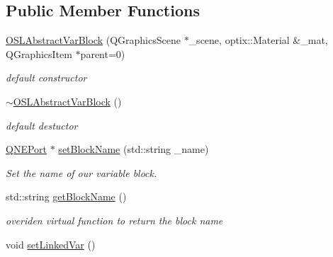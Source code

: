 \subsection*{Public Member Functions}
\begin{DoxyCompactItemize}
\item 
\hypertarget{class_o_s_l_abstract_var_block_a1b472022af7f54cae930dab0ef77afc9}{\hyperlink{class_o_s_l_abstract_var_block_a1b472022af7f54cae930dab0ef77afc9}{O\-S\-L\-Abstract\-Var\-Block} (Q\-Graphics\-Scene $\ast$\-\_\-scene, optix\-::\-Material \&\-\_\-mat, Q\-Graphics\-Item $\ast$parent=0)}\label{class_o_s_l_abstract_var_block_a1b472022af7f54cae930dab0ef77afc9}

\begin{DoxyCompactList}\small\item\em default constructor \end{DoxyCompactList}\item 
\hypertarget{class_o_s_l_abstract_var_block_ae24352aa1c2beebbf7aa3bcfd7e4a261}{\hyperlink{class_o_s_l_abstract_var_block_ae24352aa1c2beebbf7aa3bcfd7e4a261}{$\sim$\-O\-S\-L\-Abstract\-Var\-Block} ()}\label{class_o_s_l_abstract_var_block_ae24352aa1c2beebbf7aa3bcfd7e4a261}

\begin{DoxyCompactList}\small\item\em default destuctor \end{DoxyCompactList}\item 
\hyperlink{class_q_n_e_port}{Q\-N\-E\-Port} $\ast$ \hyperlink{class_o_s_l_abstract_var_block_a833548c33ea2a0eee22984507a3ffc24}{set\-Block\-Name} (std\-::string \-\_\-name)
\begin{DoxyCompactList}\small\item\em Set the name of our variable block. \end{DoxyCompactList}\item 
\hypertarget{class_o_s_l_abstract_var_block_a190d98a39c35e6febc3f1839c9b9053e}{std\-::string \hyperlink{class_o_s_l_abstract_var_block_a190d98a39c35e6febc3f1839c9b9053e}{get\-Block\-Name} ()}\label{class_o_s_l_abstract_var_block_a190d98a39c35e6febc3f1839c9b9053e}

\begin{DoxyCompactList}\small\item\em overiden virtual function to return the block name \end{DoxyCompactList}\item 
\hypertarget{class_o_s_l_abstract_var_block_a27c90e6a4193b8794e9e2efa0520bb15}{void \hyperlink{class_o_s_l_abstract_var_block_a27c90e6a4193b8794e9e2efa0520bb15}{set\-Linked\-Var} ()}\label{class_o_s_l_abstract_var_block_a27c90e6a4193b8794e9e2efa0520bb15}


\end{DoxyCompactItemize}
